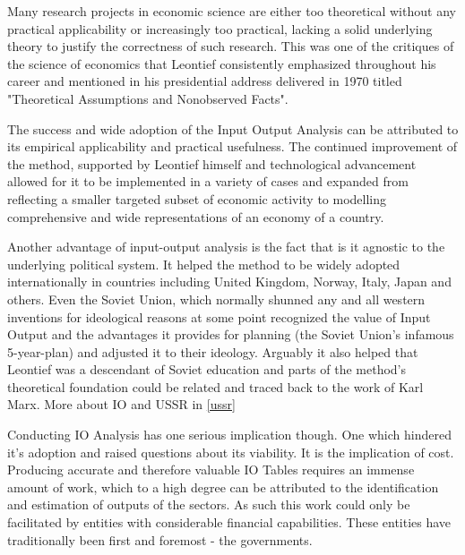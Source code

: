 \documentclass[12pt,a4paper]{scrartcl}
\begin{document}
	
	
	Many research projects in economic science are either too theoretical without any practical applicability or increasingly too practical, lacking a solid underlying theory to justify the correctness of such research. This was one of the critiques of the science of economics that Leontief consistently emphasized throughout his career and mentioned in his presidential address delivered in 1970 titled "Theoretical Assumptions and Nonobserved Facts". \cite[]{Leontief1971}
	
	The success and wide adoption of the Input Output Analysis can be attributed to its empirical applicability and practical usefulness. The continued improvement of the method, supported by Leontief himself and technological advancement allowed for it to be implemented in a variety of cases and expanded from reflecting a smaller targeted subset of economic activity to modelling comprehensive and wide representations of an economy of a country.	
	
	Another advantage of input-output analysis is the fact that is it agnostic to the underlying political system. It helped the method to be widely adopted internationally in countries including United Kingdom, Norway, Italy, Japan and others. Even the Soviet Union, which normally shunned any and all western inventions for ideological reasons at some point recognized the value of Input Output and the advantages it provides for planning (the Soviet Union's infamous 5-year-plan) and adjusted it to their ideology. Arguably it also helped that Leontief was a descendant of Soviet education and parts of the method's theoretical foundation could be related and traced back to the work of Karl Marx. \cite[p.297]{rose1995} More about IO and USSR in \ref{ussr} 


	Conducting IO Analysis has one serious implication though. One which hindered it's adoption and raised questions about its viability. It is the implication of cost. Producing accurate and therefore valuable IO Tables requires an immense amount of work, which to a high degree can be attributed to the identification and estimation of outputs of the sectors. As such this work could only be facilitated by entities with considerable financial capabilities. These entities have traditionally been first and foremost - the governments.
\end{document}
